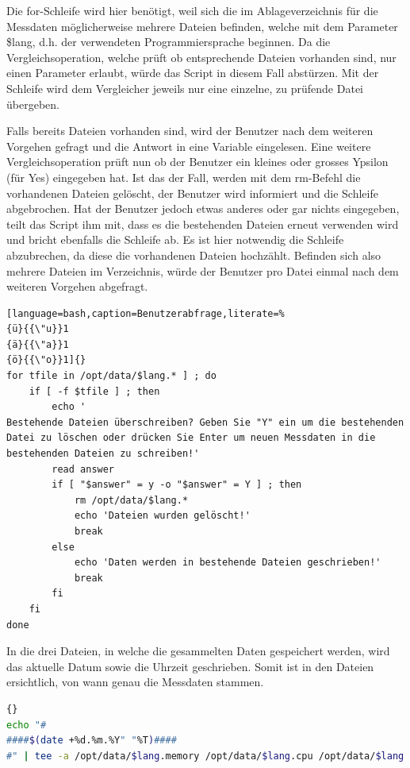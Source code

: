 \documentclass{fancydocument}
\begin{document}
Die for-Schleife wird hier benötigt, weil sich die im Ablageverzeichnis für die Messdaten möglicherweise mehrere Dateien befinden, welche mit dem Parameter \$lang, d.h. der verwendeten Programmiersprache beginnen.  Da die Vergleichsoperation, welche prüft ob entsprechende Dateien vorhanden sind, nur einen Parameter erlaubt, würde das Script in diesem Fall abstürzen. Mit der Schleife wird dem Vergleicher jeweils nur eine einzelne, zu prüfende Datei übergeben.

Falls bereits Dateien vorhanden sind, wird der Benutzer nach dem weiteren Vorgehen gefragt und die Antwort in eine Variable eingelesen. Eine weitere Vergleichsoperation prüft nun ob der Benutzer ein kleines oder grosses Ypsilon (für Yes) eingegeben hat. Ist das der Fall, werden mit dem rm-Befehl die vorhandenen Dateien gelöscht, der Benutzer wird informiert und die Schleife abgebrochen. Hat der Benutzer jedoch etwas anderes oder gar nichts eingegeben, teilt das Script ihm mit, dass es die bestehenden Dateien erneut verwenden wird und bricht ebenfalls die Schleife ab. Es ist hier notwendig die Schleife abzubrechen, da diese die vorhandenen Dateien hochzählt.  Befinden sich also mehrere Dateien im Verzeichnis, würde der Benutzer pro Datei einmal nach dem weiteren Vorgehen abgefragt.

\begin{minipage}{\textwidth}
\begin{lstlisting}[language=bash,caption=Benutzerabfrage,literate=% 
{ü}{{\"u}}1 
{ä}{{\"a}}1 
{ö}{{\"o}}1]{}
for tfile in /opt/data/$lang.* ] ; do
	if [ -f $tfile ] ; then
		echo '
Bestehende Dateien überschreiben? Geben Sie "Y" ein um die bestehenden Datei zu löschen oder drücken Sie Enter um neuen Messdaten in die bestehenden Dateien zu schreiben!'
		read answer
		if [ "$answer" = y -o "$answer" = Y ] ; then
			rm /opt/data/$lang.*
			echo 'Dateien wurden gelöscht!'
			break
		else
			echo 'Daten werden in bestehende Dateien geschrieben!'
			break		
		fi			
	fi
done
\end{lstlisting}
\end{minipage}

In die drei Dateien, in welche die gesammelten Daten gespeichert werden, wird das aktuelle Datum sowie die Uhrzeit geschrieben. Somit ist in den Dateien ersichtlich, von wann genau die Messdaten stammen.

\begin{minipage}{\textwidth}
\begin{lstlisting}[language=bash,caption=Titel einfügen]{}
echo "#
####$(date +%d.%m.%Y" "%T)####
#" | tee -a /opt/data/$lang.memory /opt/data/$lang.cpu /opt/data/$lang.time > /dev/null
\end{lstlisting}
\end{minipage}
\end{document}
